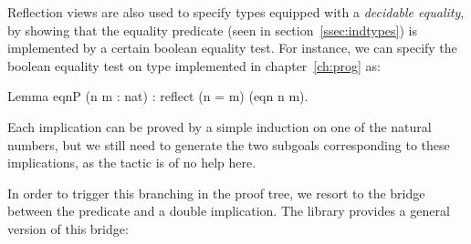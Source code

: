 Reflection views are also used to specify types equipped with a
\emph{decidable equality}, by showing that the equality predicate
 (seen in section~\ref{ssec:indtypes}) is implemented by a
certain boolean equality test. For instance, we can specify the
boolean equality test on type  implemented in
chapter~\ref{ch:prog} as:

\begin{coq}{}{}
Lemma eqnP (n m : nat) : reflect (n = m) (eqn n m).
\end{coq}

Each implication can be proved by a simple induction on one of the
natural numbers, but we still need to generate the two subgoals
corresponding to these implications, as the  tactic is of no
help here.



In order to trigger this branching in the proof tree, we resort to the
bridge between the  predicate and a double implication.
The  library provides a general version of
this bridge:

